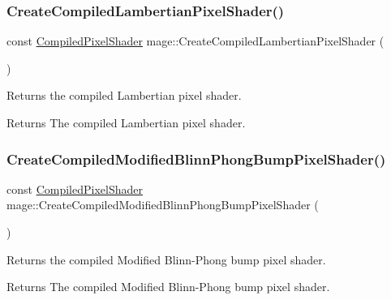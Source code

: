 \subsubsection{\texorpdfstring{Create\+Compiled\+Lambertian\+Pixel\+Shader()}{CreateCompiledLambertianPixelShader()}}
{\footnotesize\ttfamily const \hyperlink{structmage_1_1_compiled_pixel_shader}{Compiled\+Pixel\+Shader} mage\+::\+Create\+Compiled\+Lambertian\+Pixel\+Shader (\begin{DoxyParamCaption}{ }\end{DoxyParamCaption})}

Returns the compiled Lambertian pixel shader.

\begin{DoxyReturn}{Returns}
The compiled Lambertian pixel shader. 
\end{DoxyReturn}
\hypertarget{namespacemage_a058c0bf59fbe2ffca85b372b53571df8}{}\label{namespacemage_a058c0bf59fbe2ffca85b372b53571df8} 
\subsubsection{\texorpdfstring{Create\+Compiled\+Modified\+Blinn\+Phong\+Bump\+Pixel\+Shader()}{CreateCompiledModifiedBlinnPhongBumpPixelShader()}}
{\footnotesize\ttfamily const \hyperlink{structmage_1_1_compiled_pixel_shader}{Compiled\+Pixel\+Shader} mage\+::\+Create\+Compiled\+Modified\+Blinn\+Phong\+Bump\+Pixel\+Shader (\begin{DoxyParamCaption}{ }\end{DoxyParamCaption})}

Returns the compiled Modified Blinn-\/\+Phong bump pixel shader.

\begin{DoxyReturn}{Returns}
The compiled Modified Blinn-\/\+Phong bump pixel shader. 
\end{DoxyReturn}
\hypertarget{namespacemage_abbc94f13b39870cec62d921f7b581f6a}{}\label{namespacemage_abbc94f13b39870cec62d921f7b581f6a} 
